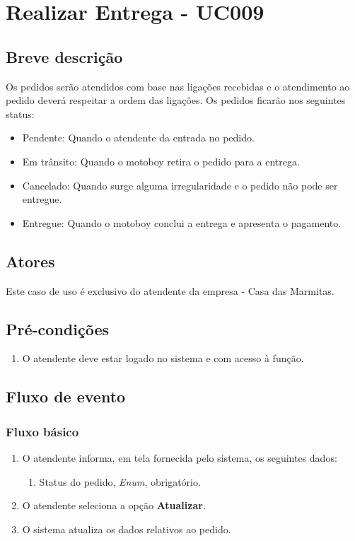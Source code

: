 \chapter{Realizar Entrega - UC009} \label{uc009}

\section{Breve descrição}

Os pedidos serão atendidos com base nas ligações recebidas e o atendimento ao pedido deverá respeitar a ordem das ligações. Os pedidos ficarão nos seguintes status:

\begin{itemize}
	\item Pendente: Quando o atendente da entrada no pedido.
	\item Em trânsito: Quando o motoboy retira o pedido para a entrega.
	\item Cancelado: Quando surge alguma irregularidade e o pedido não pode ser entregue.
	\item Entregue: Quando o motoboy conclui a entrega e apresenta o pagamento.
\end{itemize}

\section{Atores}

Este caso de uso é exclusivo do atendente da empresa - Casa das Marmitas.

\section{Pré-condições}

\begin{enumerate}
	\item O atendente deve estar logado no sistema e com acesso à função.
\end{enumerate}

\section{Fluxo de evento}

\subsection{Fluxo básico}

\begin{enumerate}
	\item O atendente informa, em tela fornecida pelo sistema, os seguintes dados:
	\begin{enumerate}
		\item Status do pedido, \emph{Enum}, obrigatório.		
	\end{enumerate}
	\item O atendente seleciona a opção \textbf{Atualizar}.
	\item O sistema atualiza os dados relativos ao pedido.
\end{enumerate}

